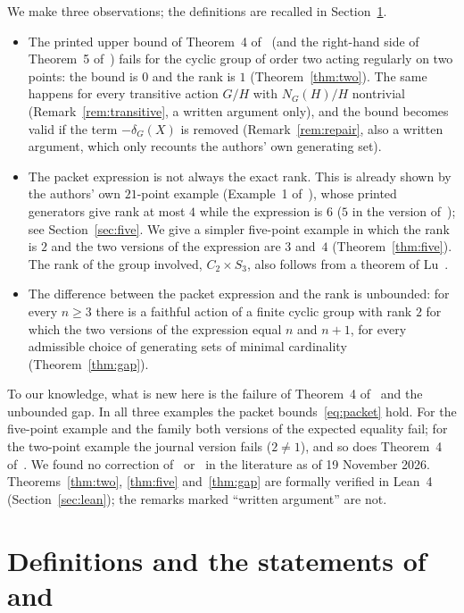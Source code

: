 \documentclass[11pt]{article}
\theoremstyle{remark}
\begin{document}
We make three observations; the definitions are recalled in
Section~\ref{sec:defs}.
\begin{itemize}
\item The printed upper bound of Theorem~4 of~\cite{lrr} (and the right-hand
side of Theorem~5 of~\cite{rlr}) fails for the cyclic group of order two
acting regularly on two points: the bound is $0$ and the rank is $1$
(Theorem~\ref{thm:two}). The same happens for every transitive action $G/H$
with $N_G(H)/H$ nontrivial (Remark~\ref{rem:transitive}, a written argument
only), and the bound becomes valid if the term $-\delta_G(X)$ is removed
(Remark~\ref{rem:repair}, also a written argument, which only recounts the
authors' own generating set).
\item The packet expression is not always the exact rank. This is already
shown by the authors' own $21$-point example (Example~1 of~\cite{lrr}), whose
printed generators give rank at most $4$ while the expression is $6$ ($5$ in
the version of~\cite{rlr}); see Section~\ref{sec:five}. We give a simpler
five-point example in which the rank is $2$ and the two versions of the
expression are $3$ and~$4$ (Theorem~\ref{thm:five}). The rank of the group
involved, $C_2\times S_3$, also follows from a theorem of Lu~\cite{lu}.
\item The difference between the packet expression and the rank is
unbounded: for every $n\ge3$ there is a faithful action of a finite cyclic
group with rank $2$ for which the two versions of the expression equal $n$ and
$n+1$, for every admissible choice of generating sets of minimal cardinality
(Theorem~\ref{thm:gap}).
\end{itemize}
To our knowledge, what is new here is the failure of Theorem~4
of~\cite{lrr} and the unbounded gap. In all three examples the packet
bounds~\eqref{eq:packet} hold. For the five-point example and the family both
versions of the expected equality fail; for the two-point example the journal
version fails ($2\ne1$), and so does Theorem~4 of~\cite{lrr}. We found no correction of~\cite{lrr}
or~\cite{rlr} in the literature as of 19 November 2026. Theorems~\ref{thm:two},
\ref{thm:five} and~\ref{thm:gap} are formally verified in Lean~4
(Section~\ref{sec:lean}); the remarks marked ``written argument'' are not.

\section{Definitions and the statements of~\texorpdfstring{\cite{lrr}}{[2]} and~\texorpdfstring{\cite{rlr}}{[5]}}
\label{sec:defs}
\end{document}
